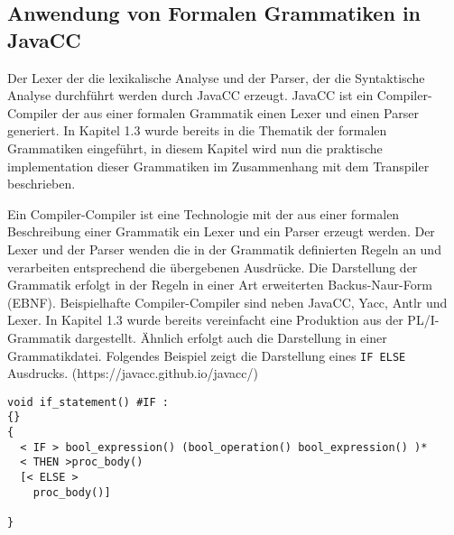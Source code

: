      
\subsection{Anwendung von Formalen Grammatiken in JavaCC}

Der Lexer der die lexikalische Analyse und der Parser, der die Syntaktische Analyse durchführt werden durch JavaCC erzeugt. 
JavaCC ist ein Compiler-Compiler der aus einer formalen Grammatik einen Lexer und einen Parser generiert. 
In Kapitel 1.3 wurde bereits in die Thematik der formalen Grammatiken eingeführt, in diesem Kapitel wird nun die praktische implementation dieser Grammatiken im Zusammenhang mit dem Transpiler beschrieben.

Ein Compiler-Compiler ist eine Technologie mit der aus einer formalen Beschreibung einer Grammatik ein Lexer und ein Parser erzeugt werden. 
Der Lexer und der Parser wenden die in der Grammatik definierten Regeln an und verarbeiten entsprechend die übergebenen Ausdrücke.
Die Darstellung der Grammatik erfolgt in der Regeln in einer Art erweiterten Backus-Naur-Form (EBNF). 
Beispielhafte Compiler-Compiler sind neben JavaCC, Yacc, Antlr und Lexer.
In Kapitel 1.3 wurde bereits vereinfacht eine Produktion aus der PL/I-Grammatik dargestellt. Ähnlich erfolgt auch die Darstellung in einer Grammatikdatei. Folgendes Beispiel zeigt die Darstellung eines \verb+IF ELSE+ Ausdrucks. 
(https://javacc.github.io/javacc/)

\begin{verbatim}
void if_statement() #IF :
{}
{
  < IF > bool_expression() (bool_operation() bool_expression() )*
  < THEN >proc_body()
  [< ELSE >
  	proc_body()]
  	
}
\end{verbatim}

